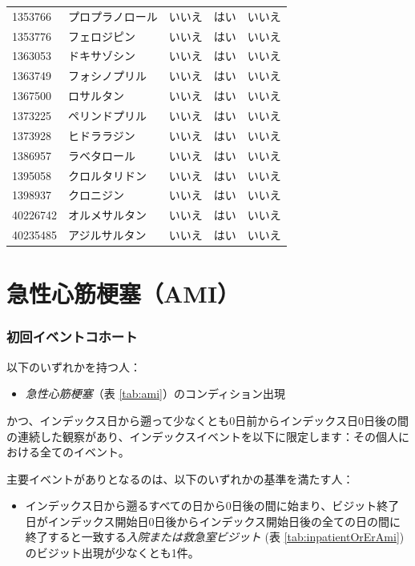 \documentclass[
  11pt]{book}
\providecommand{\tightlist}{%
  \setlength{\itemsep}{0pt}\setlength{\parskip}{0pt}}
\theoremstyle{definition}
\theoremstyle{definition}
\theoremstyle{definition}
\theoremstyle{definition}
\theoremstyle{remark}
\begin{document}
\begin{longtable}[]{@{}lllll@{}}
1353766 & プロプラノロール & いいえ & はい & いいえ \\
1353776 & フェロジピン & いいえ & はい & いいえ \\
1363053 & ドキサゾシン & いいえ & はい & いいえ \\
1363749 & フォシノプリル & いいえ & はい & いいえ \\
1367500 & ロサルタン & いいえ & はい & いいえ \\
1373225 & ペリンドプリル & いいえ & はい & いいえ \\
1373928 & ヒドララジン & いいえ & はい & いいえ \\
1386957 & ラベタロール & いいえ & はい & いいえ \\
1395058 & クロルタリドン & いいえ & はい & いいえ \\
1398937 & クロニジン & いいえ & はい & いいえ \\
40226742 & オルメサルタン & いいえ & はい & いいえ \\
40235485 & アジルサルタン & いいえ & はい & いいえ \\
\end{longtable}

\section{急性心筋梗塞（AMI）}\label{Ami}

\subsubsection*{初回イベントコホート}\label{ux521dux56deux30a4ux30d9ux30f3ux30c8ux30b3ux30dbux30fcux30c8-2}

以下のいずれかを持つ人：

\begin{itemize}
\tightlist
\item
  \emph{急性心筋梗塞}（表 \ref{tab:ami}）のコンディション出現
\end{itemize}

かつ、インデックス日から遡って少なくとも0日前からインデックス日0日後の間の連続した観察があり、インデックスイベントを以下に限定します：その個人における全てのイベント。

主要イベントがありとなるのは、以下のいずれかの基準を満たす人：

\begin{itemize}
\tightlist
\item
  インデックス日から遡るすべての日から0日後の間に始まり、ビジット終了日がインデックス開始日0日後からインデックス開始日後の全ての日の間に終了すると一致する\emph{入院または救急室ビジット} (表 \ref{tab:inpatientOrErAmi})のビジット出現が少なくとも1件。
\end{itemize}
\end{document}
